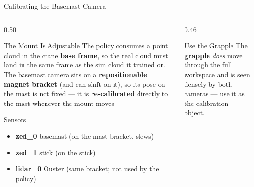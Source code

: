 \documentclass[aspectratio=169]{beamer}
\newenvironment{tightitemize}{
  \begin{itemize}\setlength{\itemsep}{3pt}\setlength{\parskip}{0pt}}{\end{itemize}}
\begin{document}
\begin{frame}{Calibrating the Basemast Camera}
\begin{columns}[c,totalwidth=\textwidth]
  \begin{column}{0.50\textwidth}
    \begin{block}{The Mount Is Adjustable}
      \small
      The policy consumes a point cloud in the crane \textbf{base frame}, so the real cloud must land in the same frame as the sim cloud it trained on. The basemast camera sits on a \textbf{repositionable magnet bracket} (and can shift on it), so its pose on the mast is not fixed --- it is \textbf{re-calibrated} directly to the mast whenever the mount moves.
    \end{block}
    \begin{block}{Sensors}
      \scriptsize
      \begin{tightitemize}
        \item \textbf{zed\_0} basemast (on the mast bracket, slews)
        \item \textbf{zed\_1} stick (on the stick)
        \item \textbf{lidar\_0} Ouster (same bracket; not used by the policy)
      \end{tightitemize}
    \end{block}
  \end{column}
  \begin{column}{0.46\textwidth}
    \begin{exampleblock}{Use the Grapple}
      \footnotesize
      The \textbf{grapple} \emph{does} move through the full workspace and is seen densely by both cameras --- use it as the calibration object.
    \end{exampleblock}
  \end{column}
\end{columns}
\end{frame}
\end{document}
